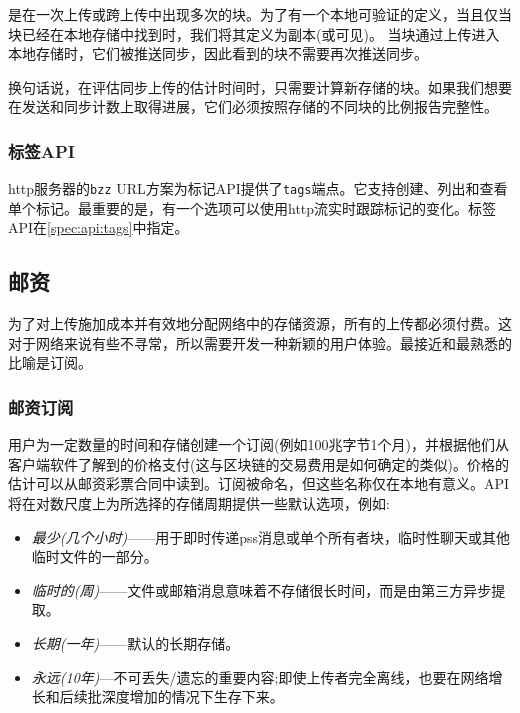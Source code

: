 是在一次上传或跨上传中出现多次的块。为了有一个本地可验证的定义，当且仅当块已经在本地存储中找到时，我们将其定义为副本(或可见)。
当块通过上传进入本地存储时，它们被推送同步，因此看到的块不需要再次推送同步。

换句话说，在评估同步上传的估计时间时，只需要计算新存储的块。如果我们想要在发送和同步计数上取得进展，它们必须按照存储的不同块的比例报告完整性。

\subsubsection{标签API} 

http服务器的\lstinline{bzz} URL方案为标记API提供了\lstinline{tags}端点。它支持创建、列出和查看单个标记。最重要的是，有一个选项可以使用http流实时跟踪标记的变化。标签API在\ref{spec:api:tags}中指定。



\subsection{邮资\statusgreen}\label{sec:postage-ux}

为了对上传施加成本并有效地分配网络中的存储资源，所有的上传都必须付费。这对于网络来说有些不寻常，所以需要开发一种新颖的用户体验。最接近和最熟悉的比喻是订阅。

\subsubsection{邮资订阅}

用户为一定数量的时间和存储创建一个订阅(例如100兆字节1个月)，并根据他们从客户端软件了解到的价格支付(这与区块链的交易费用是如何确定的类似)。价格的估计可以从邮资彩票合同中读到。订阅被命名，但这些名称仅在本地有意义。API将在对数尺度上为所选择的存储周期提供一些默认选项，例如: 

\begin{itemize}
\item \emph{最少(几个小时)}——用于即时传递pss消息或单个所有者块，临时性聊天或其他临时文件的一部分。
\item \emph{临时的(周)}——文件或邮箱消息意味着不存储很长时间，而是由第三方异步提取。
\item \emph{长期(一年)}——默认的长期存储。 
\item \emph{永远(10年)}—不可丢失/遗忘的重要内容;即使上传者完全离线，也要在网络增长和后续批深度增加的情况下生存下来。
\end{itemize}

